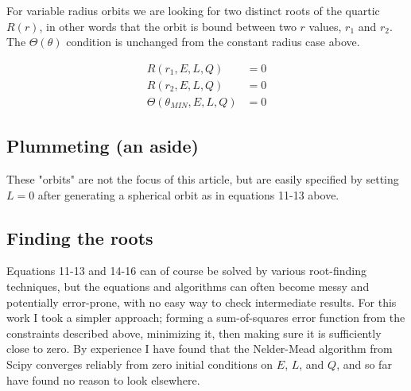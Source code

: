 \documentclass[11pt]{article}
\begin{document}
For variable radius orbits we are looking for two distinct roots of the quartic $R(r)$, in other words that the orbit is bound between two $r$ values, $r_1$ and $r_2$.  The $\Theta (\theta)$ condition is unchanged from the constant radius case above.

\begin{align}
R(r_1, E, L, Q) &= 0 \\
R(r_2, E, L, Q) &= 0 \\
\Theta(\theta_{MIN}, E, L, Q) &= 0
\end{align}

\subsection{Plummeting (an aside)}

These "orbits" are not the focus of this article, but are easily specified by setting $L = 0$ after generating a spherical orbit as in equations 11-13 above.

\subsection{Finding the roots}

Equations 11-13 and 14-16 can of course be solved by various root-finding techniques, but the equations and algorithms can often become messy and potentially error-prone, with no easy way to check intermediate results.  For this work I took a simpler approach; forming a sum-of-squares error function from the constraints described above, minimizing it, then making sure it is sufficiently close to zero.  By experience I have found that the Nelder-Mead algorithm from Scipy converges reliably from zero initial conditions on $E$, $L$, and $Q$, and so far have found no reason to look elsewhere.
\end{document}
